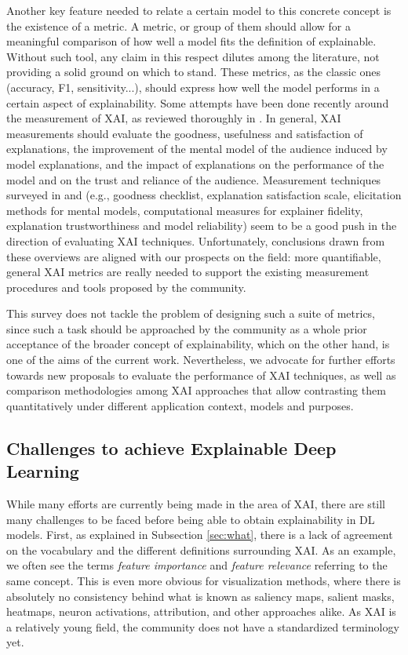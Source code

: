 \documentclass[final]{elsarticle}
\begin{document}
Another key feature needed to relate a certain model to this concrete concept is the existence of a metric. A metric, or group of them should allow for a meaningful comparison of how well a model fits the definition of explainable. Without such tool, any claim in this respect dilutes among the literature, not providing a solid ground on which to stand. These metrics, as the classic ones (accuracy, F1, sensitivity...), should express how well the model performs in a certain aspect of explainability. {\color{black}Some attempts have been done recently around the measurement of XAI, as reviewed thoroughly in \cite{1812.04608,1811.11839}. In general, XAI measurements should evaluate the goodness, usefulness and satisfaction of explanations, the improvement of the mental model of the audience induced by model explanations, and the impact of explanations on the performance of the model and on the trust and reliance of the audience. Measurement techniques surveyed in \cite{1812.04608} and \cite{1811.11839} (e.g., goodness checklist, explanation satisfaction scale, elicitation methods for mental models, computational measures for explainer fidelity, explanation trustworthiness and model reliability) seem to be a good push in the direction of evaluating XAI techniques. Unfortunately, conclusions drawn from these overviews are aligned with our prospects on the field: more quantifiable, general XAI metrics are really needed to support the existing measurement procedures and tools proposed by the community.}

This survey does not tackle the problem of designing such a suite of metrics, since such a task should be approached by the community as a whole prior acceptance of the broader concept of explainability, which on the other hand, is one of the aims of the current work. {\color{black}Nevertheless, we advocate for further efforts towards new proposals to evaluate the performance of XAI techniques, as well as comparison methodologies among XAI approaches that allow contrasting them quantitatively under different application context, models and purposes.}

\subsection{Challenges to achieve Explainable Deep Learning} \label{ssec:deep_learning_challenges}

While many efforts are currently being made in the area of XAI, there are still many challenges to be faced before being able to obtain explainability in DL models. First, as explained in Subsection \ref{sec:what}, there is a lack of agreement on the vocabulary and the different definitions surrounding XAI. As an example, we often see the terms \textit{feature importance} and \textit{feature relevance} referring to the same concept. This is even more obvious for visualization methods, where there is absolutely no consistency behind what is known as saliency maps, salient masks, heatmaps, neuron activations, attribution, and other approaches alike. As XAI is a relatively young field, the community does not have a standardized terminology yet. 
\end{document}
